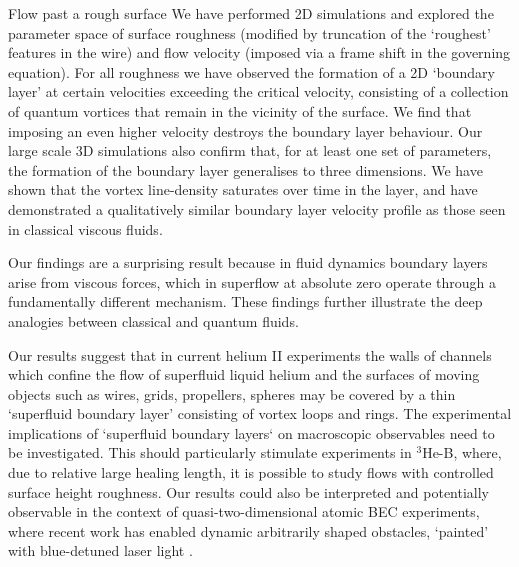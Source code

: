 \begin{chapter}{\label{cha:afm}Flow past a rough surface}
We have performed 2D simulations and explored the parameter space of surface roughness (modified by truncation of the `roughest' features in the wire) and flow velocity (imposed via a frame shift in the governing equation). For all roughness we have observed the formation of a 2D `boundary layer' at certain velocities exceeding the critical velocity, consisting of a collection of quantum vortices that remain in the vicinity of the surface. We find that imposing an even higher velocity destroys the boundary layer behaviour. Our large scale 3D simulations also confirm that, for at least one set of parameters, the formation of the boundary layer generalises to three dimensions. We have shown that the vortex line-density saturates over time in the layer, and have demonstrated a qualitatively similar boundary layer velocity profile as those seen in classical viscous fluids.

Our findings are a surprising result because in fluid dynamics boundary layers arise from viscous forces, which in superflow at absolute zero operate through a fundamentally different mechanism.  These findings further illustrate the deep analogies between classical and quantum fluids.

Our results suggest that in current helium II experiments the walls of channels which confine the flow of superfluid liquid helium and the surfaces of moving objects such as wires, grids, propellers, spheres may be covered by a thin `superfluid boundary layer' consisting of vortex loops and rings. The experimental implications of `superfluid boundary layers` on macroscopic
observables need to be investigated.  This should particularly stimulate experiments in $^3$He-B, where, due to relative large healing length, it is possible to study flows with controlled surface height roughness. Our results could also be interpreted and potentially observable in the context of quasi-two-dimensional atomic BEC experiments, where recent work has enabled dynamic arbitrarily shaped obstacles, `painted' with blue-detuned laser light \cite{Henderson09}.
\end{chapter}



